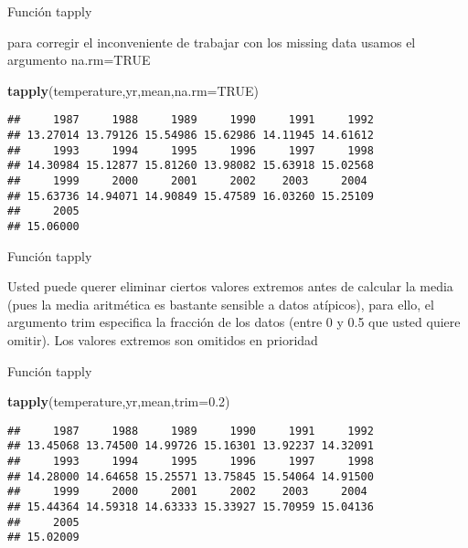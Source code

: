 \documentclass[ignorenonframetext,]{beamer}
\newenvironment{Shaded}{\begin{snugshade}}{\end{snugshade}}
\newcommand{\KeywordTok}[1]{\textcolor[rgb]{0.13,0.29,0.53}{\textbf{#1}}}
\newcommand{\DataTypeTok}[1]{\textcolor[rgb]{0.13,0.29,0.53}{#1}}
\newcommand{\FloatTok}[1]{\textcolor[rgb]{0.00,0.00,0.81}{#1}}
\newcommand{\OtherTok}[1]{\textcolor[rgb]{0.56,0.35,0.01}{#1}}
\newcommand{\NormalTok}[1]{#1}
\begin{document}
\begin{frame}[fragile]{Función tapply}

para corregir el inconveniente de trabajar con los missing data usamos
el argumento na.rm=TRUE

\begin{Shaded}
\begin{Highlighting}[]
\KeywordTok{tapply}\NormalTok{(temperature,yr,mean,}\DataTypeTok{na.rm=}\OtherTok{TRUE}\NormalTok{)}
\end{Highlighting}
\end{Shaded}

\begin{verbatim}
##     1987     1988     1989     1990     1991     1992     
## 13.27014 13.79126 15.54986 15.62986 14.11945 14.61612 
##     1993     1994     1995     1996     1997     1998     
## 14.30984 15.12877 15.81260 13.98082 15.63918 15.02568 
##     1999     2000     2001     2002    2003     2004      
## 15.63736 14.94071 14.90849 15.47589 16.03260 15.25109 
##     2005  
## 15.06000 

\end{verbatim}

\end{frame}

\begin{frame}{Función tapply}

Usted puede querer eliminar ciertos valores extremos antes de calcular
la media (pues la media aritmética es bastante sensible a datos
atípicos), para ello, el argumento trim especifica la fracción de los
datos (entre 0 y 0.5 que usted quiere omitir). Los valores extremos son
omitidos en prioridad

\end{frame}

\begin{frame}[fragile]{Función tapply}

\begin{Shaded}
\begin{Highlighting}[]
\KeywordTok{tapply}\NormalTok{(temperature,yr,mean,}\DataTypeTok{trim=}\FloatTok{0.2}\NormalTok{)}
\end{Highlighting}
\end{Shaded}

\begin{verbatim}
##     1987     1988     1989     1990     1991     1992     
## 13.45068 13.74500 14.99726 15.16301 13.92237 14.32091
##     1993     1994     1995     1996     1997     1998     
## 14.28000 14.64658 15.25571 13.75845 15.54064 14.91500 
##     1999     2000     2001     2002    2003     2004      
## 15.44364 14.59318 14.63333 15.33927 15.70959 15.04136 
##     2005  
## 15.02009 
\end{verbatim}

\end{frame}
\end{document}
